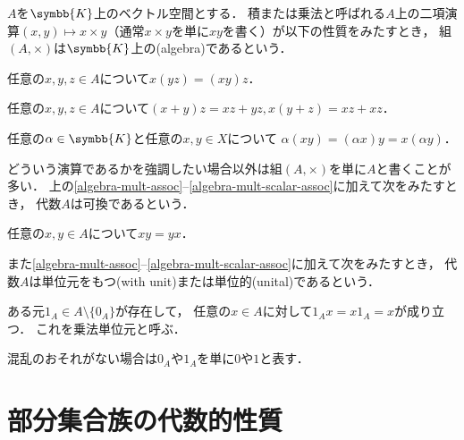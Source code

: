 \documentclass[../main.tex]{subfiles}
\begin{document}
\begin{thmbox}
\begin{definition}[（代数）]
\(A\)を\(\symbb{K}\)上のベクトル空間とする．
積または乗法と呼ばれる\(A\)上の二項演算\((x, y) \mapsto x \mathbin{\times} y\)（通常\(x \mathbin{\times} y\)を単に\(xy\)を書く）が以下の性質をみたすとき，
組\((A, \mathord{\times})\)は\(\symbb{K}\)上の(algebra)であるという．
\begin{conditions}
    \item\label{algebra-mult-assoc} 任意の\(x, y, z \in A\)について\(x (yz) = (xy) z\)．
    \item 任意の\(x, y, z \in A\)について\((x + y) z = xz + yz, x (y + z) = xz + xz\)．
    \item\label{algebra-mult-scalar-assoc} 任意の\(\alpha \in \symbb{K}\)と任意の\(x, y \in X\)について
        \(\alpha (xy) = (\alpha x) y = x (\alpha y)\)．
\end{conditions}
どういう演算であるかを強調したい場合以外は組\((A, \mathord{\times})\)を単に\(A\)と書くことが多い．
上の\ref{algebra-mult-assoc}--\ref{algebra-mult-scalar-assoc}に加えて次をみたすとき，
代数\(A\)は可換であるという．
\begin{conditions}[resume]
    \item 任意の\(x, y\in A\)について\(x y  = y x\)．
\end{conditions}
また\ref{algebra-mult-assoc}--\ref{algebra-mult-scalar-assoc}に加えて次をみたすとき，
代数\(A\)は単位元をもつ(with unit)または単位的(unital)であるという．
\begin{conditions}[resume]
    \item ある元\(1_A \in A \setminus \{0_A\}\)が存在して，
        任意の\(x \in A\)に対して\(1_A x  = x 1_A = x\)が成り立つ．
        これを乗法単位元と呼ぶ．
\end{conditions}
\end{definition}
\end{thmbox}

\noindent 混乱のおそれがない場合は\(0_A\)や\(1_A\)を単に\(0\)や\(1\)と表す．

\section{部分集合族の代数的性質}
\end{document}

